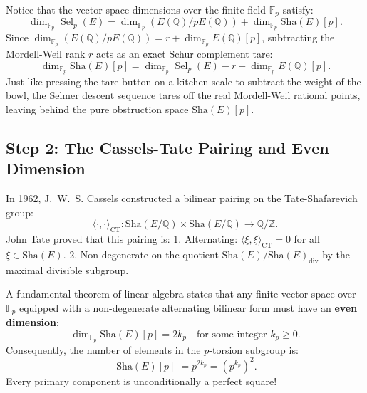 \documentclass[11pt,a4paper]{article}
\providecommand{\Sha}{\mathrm{Sha}}
\theoremstyle{definition}
\begin{document}
Notice that the vector space dimensions over the finite field $\mathbb{F}_p$ satisfy:
\begin{equation}
\dim_{\mathbb{F}_p} \operatorname{Sel}_p(E) = \dim_{\mathbb{F}_p} (E(\mathbb{Q})/p E(\mathbb{Q})) + \dim_{\mathbb{F}_p} \Sha(E)[p].
\end{equation}
Since $\dim_{\mathbb{F}_p} (E(\mathbb{Q})/p E(\mathbb{Q})) = r + \dim_{\mathbb{F}_p} E(\mathbb{Q})[p]$, subtracting the Mordell-Weil rank $r$ acts as an exact Schur complement tare:
\begin{equation}
\dim_{\mathbb{F}_p} \Sha(E)[p] = \dim_{\mathbb{F}_p} \operatorname{Sel}_p(E) - r - \dim_{\mathbb{F}_p} E(\mathbb{Q})[p].
\end{equation}
Just like pressing the tare button on a kitchen scale to subtract the weight of the bowl, the Selmer descent sequence tares off the real Mordell-Weil rational points, leaving behind the pure obstruction space $\Sha(E)[p]$.

\subsection{Step 2: The Cassels-Tate Pairing and Even Dimension}
In 1962, J.~W.~S. Cassels constructed a bilinear pairing on the Tate-Shafarevich group:
\begin{equation}
\langle \cdot, \cdot \rangle_{\mathrm{CT}} : \Sha(E/\mathbb{Q}) \times \Sha(E/\mathbb{Q}) \longrightarrow \mathbb{Q}/\mathbb{Z}.
\end{equation}
John Tate proved that this pairing is:
1. Alternating: $\langle \xi, \xi \rangle_{\mathrm{CT}} = 0$ for all $\xi \in \Sha(E)$.
2. Non-degenerate on the quotient $\Sha(E)/\Sha(E)_{\mathrm{div}}$ by the maximal divisible subgroup.

A fundamental theorem of linear algebra states that any finite vector space over $\mathbb{F}_p$ equipped with a non-degenerate alternating bilinear form must have an \textbf{even dimension}:
\begin{equation}
\dim_{\mathbb{F}_p} \Sha(E)[p] = 2 k_p \quad \text{for some integer } k_p \ge 0.
\end{equation}
Consequently, the number of elements in the $p$-torsion subgroup is:
\begin{equation}
|\Sha(E)[p]| = p^{2 k_p} = (p^{k_p})^2.
\end{equation}
Every primary component is unconditionally a perfect square!
\end{document}
